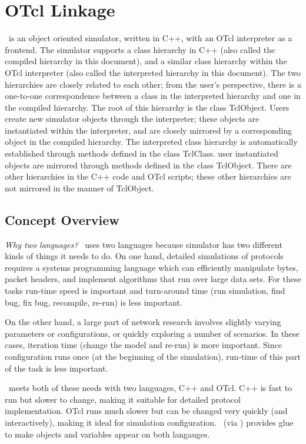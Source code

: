 \chapter{OTcl Linkage}
\label{chap:otcl:intro}

\ns\ is an object oriented simulator,
written in C++, with an OTcl interpreter as a frontend.
The simulator supports a class hierarchy in C++
(also called the compiled hierarchy in this document),
and a similar class hierarchy within the OTcl interpreter
(also called the interpreted hierarchy in this document).
The two hierarchies are closely related to each other;
from the user's perspective,
there is a one-to-one correspondence
between a class in the interpreted hierarchy
and one in the compiled hierarchy.
The root of this hierarchy is the class TclObject.
Users create new simulator objects through the interpreter;
these objects are instantiated within the interpreter, 
and are closely mirrored by a corresponding object
in the compiled hierarchy.
The interpreted class hierarchy is automatically established through
methods defined in the class TclClass.
user instantiated objects are mirrored through methods
defined in the class TclObject.
There are other hierarchies in the C++ code and OTcl scripts;
these other hierarchies are not mirrored in the manner of TclObject.

\section{Concept Overview}

\emph{Why two languages?}
\ns\ uses two languages because simulator has two different
  kinds of things it needs to do.
On one hand, detailed simulations of protocols
  requires a systems programming language
  which can efficiently manipulate bytes, packet headers,
  and implement algorithms that run over large data sets.
For these tasks run-time speed is important and
  turn-around time (run simulation, find bug, fix bug, recompile, re-run)
  is less important.

On the other hand,
  a large part of network research involves slightly varying
  parameters or configurations,
  or quickly exploring a number of scenarios.
In these cases, iteration time (change the model and re-run)
  is more important.
Since configuration runs once (at the beginning of the simulation),
  run-time of this part of the task is less important.

\ns\ meets both of these needs with two languages,
  C++ and OTcl.
C++ is fast to run but slower to change, making it suitable
  for detailed protocol implementation.
OTcl runs much slower but can be changed very quickly (and interactively),
  making it ideal for simulation configuration.
\ns\ (via )
  provides glue to make objects and variables appear on both langauges.

